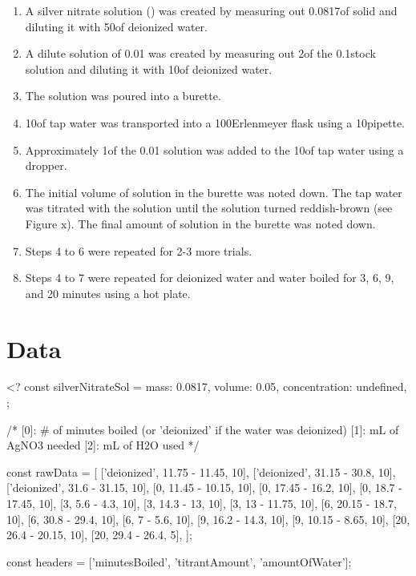 \documentclass[12pt, demo]{article}
\begin{document}
\begin{enumerate}
	\item A silver nitrate solution () was created by measuring out 0.0817\g of solid  and diluting it with 50\ml of deionized water.
	\item A dilute solution of 0.01\mpl {} was created by measuring out 2\ml of the 0.1\mpl stock solution and diluting it with 10\ml of deionized water.
	\item The  solution was poured into a burette.
	\item 10\ml of tap water was transported into a 100\ml Erlenmeyer flask using a 10\ml pipette.
	\item Approximately 1\ml of the 0.01\mpl {} solution was added to the 10\ml of tap water using a dropper.
	\item The initial volume of  solution in the burette was noted down. The tap water was titrated with the  solution until the solution turned reddish-brown (see Figure x). The final amount of solution in the burette was noted down.
	\item Steps 4 to 6 were repeated for 2-3 more trials.
	\item Steps 4 to 7 were repeated for deionized water and water boiled for 3, 6, 9, and 20 minutes using a hot plate.
\end{enumerate}

\section*{Data}

<?
const silverNitrateSol = {
	mass: 0.0817,
	volume: 0.05,
	concentration: undefined,
};

/*
[0]: # of minutes boiled (or 'deionized' if the water was deionized)
[1]: mL of AgNO3 needed
[2]: mL of H2O used
*/

const rawData = [
	['deionized', 11.75 - 11.45, 10],
	['deionized', 31.15 - 30.8, 10],
	['deionized', 31.6 - 31.15, 10],
	[0, 11.45 - 10.15, 10],
	[0, 17.45 - 16.2, 10],
	[0, 18.7 - 17.45, 10],
	[3, 5.6 - 4.3, 10],
	[3, 14.3 - 13, 10],
	[3, 13 - 11.75, 10],
	[6, 20.15 - 18.7, 10],
	[6, 30.8 - 29.4, 10],
	[6, 7 - 5.6, 10],
	[9, 16.2 - 14.3, 10],
	[9, 10.15 - 8.65, 10],
	[20, 26.4 - 20.15, 10],
	[20, 29.4 - 26.4, 5],
];

const headers = ['minutesBoiled', 'titrantAmount', 'amountOfWater'];
\end{document}
